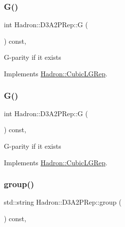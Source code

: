 \subsubsection{\texorpdfstring{G()}{G()}\hspace{0.1cm}{\footnotesize\ttfamily [2/3]}}
{\footnotesize\ttfamily int Hadron\+::\+D3\+A2\+P\+Rep\+::G (\begin{DoxyParamCaption}{ }\end{DoxyParamCaption}) const\hspace{0.3cm}{\ttfamily [inline]}, {\ttfamily [virtual]}}

G-\/parity if it exists 

Implements \mbox{\hyperlink{structHadron_1_1CubicLGRep_ace26f7b2d55e3a668a14cb9026da5231}{Hadron\+::\+Cubic\+L\+G\+Rep}}.

\mbox{\label{structHadron_1_1D3A2PRep_a66a258648b3e253504417736d0c454a8}} 
\subsubsection{\texorpdfstring{G()}{G()}\hspace{0.1cm}{\footnotesize\ttfamily [3/3]}}
{\footnotesize\ttfamily int Hadron\+::\+D3\+A2\+P\+Rep\+::G (\begin{DoxyParamCaption}{ }\end{DoxyParamCaption}) const\hspace{0.3cm}{\ttfamily [inline]}, {\ttfamily [virtual]}}

G-\/parity if it exists 

Implements \mbox{\hyperlink{structHadron_1_1CubicLGRep_ace26f7b2d55e3a668a14cb9026da5231}{Hadron\+::\+Cubic\+L\+G\+Rep}}.

\mbox{\label{structHadron_1_1D3A2PRep_a920496e210c2cdc2edb80a9903cd443a}} 
\subsubsection{\texorpdfstring{group()}{group()}\hspace{0.1cm}{\footnotesize\ttfamily [1/3]}}
{\footnotesize\ttfamily std\+::string Hadron\+::\+D3\+A2\+P\+Rep\+::group (\begin{DoxyParamCaption}{ }\end{DoxyParamCaption}) const\hspace{0.3cm}{\ttfamily [inline]}, {\ttfamily [virtual]}}

